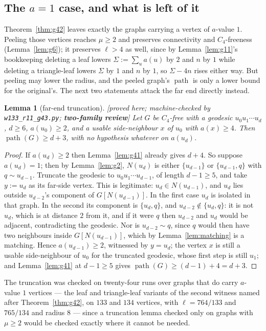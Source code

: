 \documentclass[11pt]{article}
\theoremstyle{plain}
\newtheorem{lemma}[theorem]{Lemma}
\theoremstyle{definition}
\theoremstyle{remark}
\numberwithin{equation}{section}
\newcommand{\pth}{\operatorname{path}}
\newcommand{\statusbox}[1]{{\small\sloppy\textsf{[#1]}}}
\newcommand{\REV}[1]{\statusbox{proved here; machine-checked by \texttt{#1};
\textbf{two-family review}}}
\begin{document}
\subsection{The $a = 1$ case, and what is left of it}

Theorem~\ref{thm:g42} leaves exactly the graphs carrying a vertex of $a$-value $1$. Peeling
those vertices reaches $\mu \ge 2$ and preserves connectivity and $C_4$-freeness
(Lemma~\ref{lem:g6}); it preserves $\ell > 4$ as well, since by Lemma~\ref{lem:g11}'s
bookkeeping deleting a leaf lowers $\Sigma := \sum_u a(u)$ by $2$ and $n$ by $1$ while
deleting a triangle-leaf lowers $\Sigma$ by $1$ and $n$ by $1$, so $\Sigma - 4n$ rises either
way. But peeling may lower the radius, and the peeled graph's $\pth$ is only a lower bound
for the original's. The next two statements attack the far end directly instead.

\begin{lemma}[far-end truncation]\label{lem:g43}
\REV{w133\_r11\_g43.py}
Let $G$ be $C_4$-free with a geodesic $u_0u_1\cdots u_d$, $d \ge 6$, $a(u_0)\ge 2$, and a
usable side-neighbour $x$ of $u_0$ with $a(x)\ge 4$. Then $\pth(G)\ge d+3$, with no hypothesis
whatever on $a(u_d)$.
\end{lemma}

\begin{proof}
If $a(u_d)\ge 2$ then Lemma~\ref{lem:g41} already gives $d+4$. So suppose $a(u_d) = 1$; then
by Lemma~\ref{lem:g2}, $N(u_d)$ is either $\{u_{d-1}\}$ or $\{u_{d-1}, q\}$ with
$q \sim u_{d-1}$. Truncate the geodesic to $u_0u_1\cdots u_{d-1}$, of length $d-1\ge 5$, and
take $y := u_d$ as its far-side vertex. This is legitimate: $u_d \in N(u_{d-1})$, and $u_d$
lies outside $u_{d-2}$'s component of $G[N(u_{d-1})]$. In the first case $u_d$ is isolated in
that graph. In the second its component is $\{u_d,q\}$, and $u_{d-2} \notin \{u_d,q\}$: it is
not $u_d$, which is at distance $2$ from it, and if it were $q$ then $u_{d-2}$ and $u_d$ would
be adjacent, contradicting the geodesic. Nor is $u_{d-2}\sim q$, since $q$ would then have two
neighbours inside $G[N(u_{d-1})]$, which by Lemma~\ref{lem:matching} is a matching. Hence
$a(u_{d-1})\ge 2$, witnessed by $y = u_d$; the vertex $x$ is still a usable side-neighbour of
$u_0$ for the truncated geodesic, whose first step is still $u_1$; and Lemma~\ref{lem:g41} at
$d - 1 \ge 5$ gives $\pth(G) \ge (d-1)+4 = d+3$.
\end{proof}

The truncation was checked on twenty-four runs over graphs that do carry $a$-value $1$
vertices --- the leaf and triangle-leaf variants of the second witness named after
Theorem~\ref{thm:g42}, on $133$ and $134$ vertices, with $\ell = 764/133$ and $765/134$ and
radius $8$ --- since a truncation lemma checked only on graphs with $\mu \ge 2$ would be
checked exactly where it cannot be needed.
\end{document}
